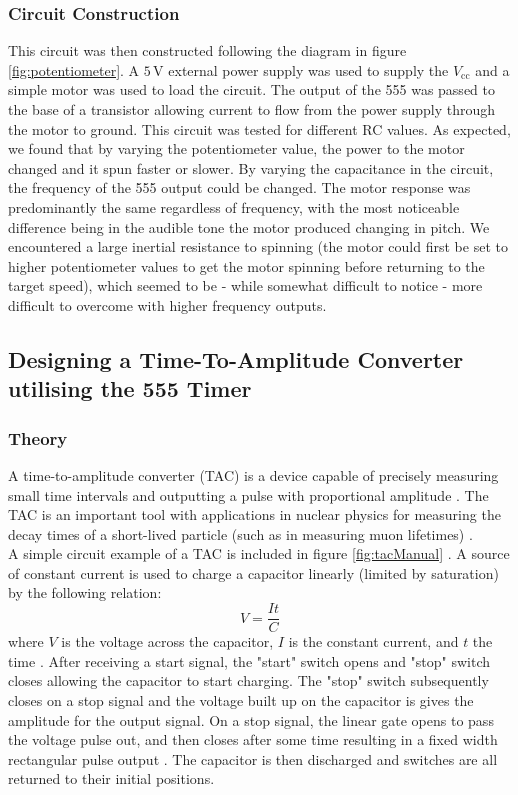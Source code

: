 \documentclass[%
 reprint,
 amsmath,amssymb,
 aps,
]{revtex4-2}
\begin{document}
        \subsubsection{Circuit Construction}
        This circuit was then constructed following the diagram in figure \ref{fig:potentiometer}. A $5\,\text{V}$ external power supply was used to supply the $V_\text{cc}$ and a simple motor was used to load the circuit. The output of the 555 was passed to the base of a transistor allowing current to flow from the power supply through the motor to ground. This circuit was tested for different RC values. As expected, we found that by varying the potentiometer value, the power to the motor changed and it spun faster or slower. By varying the capacitance in the circuit, the frequency of the 555 output could be changed. The motor response was predominantly the same regardless of frequency, with the most noticeable difference being in the audible tone the motor produced changing in pitch. We encountered a large inertial resistance to spinning (the motor could first be set to higher potentiometer values to get the motor spinning before returning to the target speed), which seemed to be - while somewhat difficult to notice - more difficult to overcome with higher frequency outputs.


    \subsection{Designing a Time-To-Amplitude Converter utilising the 555 Timer}

        \subsubsection{Theory}
        A time-to-amplitude converter (TAC) is a device capable of precisely measuring small time intervals and outputting a pulse with proportional amplitude \cite{ortec}. The TAC is an important tool with applications in nuclear physics for measuring the decay times of a short-lived particle (such as in measuring muon lifetimes) \cite{horowitz, muons}.\\

        A simple circuit example of a TAC is included in figure \ref{fig:tacManual} \cite{ortec}. A source of constant current is used to charge a capacitor linearly (limited by saturation) by the following relation:
        \begin{equation}
            V = \frac{I t}{C}
        \end{equation}where $V$ is the voltage across the capacitor, $I$ is the constant current, and $t$ the time \cite{ortec}. After receiving a start signal, the "start" switch opens and "stop" switch closes allowing the capacitor to start charging. The "stop" switch subsequently closes on a stop signal and the voltage built up on the capacitor is gives the amplitude for the output signal. On a stop signal, the linear gate opens to pass the voltage pulse out, and then closes after some time resulting in a fixed width rectangular pulse output \cite{ortec}. The capacitor is then discharged and switches are all returned to their initial positions.\\
\end{document}

